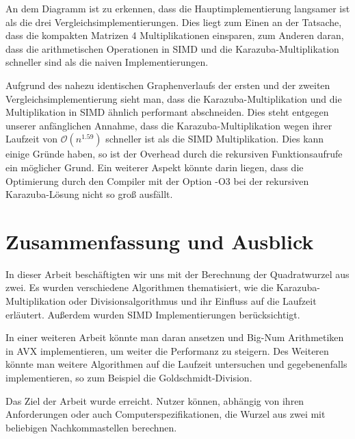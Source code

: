 \documentclass[course=erap]{aspdoc}
\begin{document}
An dem Diagramm ist zu erkennen, dass die Hauptimplementierung langsamer ist als die drei Vergleichsimplementierungen. Dies liegt zum Einen an der Tatsache, dass die kompakten Matrizen 4 Multiplikationen einsparen, zum 
Anderen daran, dass die arithmetischen Operationen in SIMD und die Karazuba-Multiplikation schneller sind als die naiven Implementierungen. \par
Aufgrund des nahezu identischen Graphenverlaufs der ersten und der zweiten Vergleichsimplementierung sieht man, dass die Karazuba-Multiplikation und die Multiplikation in SIMD ähnlich performant abschneiden. Dies steht 
entgegen unserer anfänglichen Annahme, dass die Karazuba-Multiplikation wegen ihrer Laufzeit von $\mathcal{O}(n^{1.59})$ schneller ist als die SIMD Multiplikation. Dies kann einige Gründe haben, so ist der Overhead durch die rekursiven 
Funktionsaufrufe ein möglicher Grund. Ein weiterer Aspekt könnte darin liegen, dass die Optimierung durch den Compiler mit der Option -O3 bei der rekursiven Karazuba-Lösung nicht so groß ausfällt.

\section{Zusammenfassung und Ausblick} \label{sec:zusammenfassung}
In dieser Arbeit beschäftigten wir uns mit der Berechnung der Quadratwurzel aus zwei. Es wurden verschiedene Algorithmen thematisiert, wie die Karazuba-Multiplikation oder Divisionsalgorithmus und ihr Einfluss auf die Laufzeit erläutert. Außerdem wurden SIMD Implementierungen berücksichtigt. \par
In einer weiteren Arbeit könnte man daran ansetzen und Big-Num Arithmetiken in AVX implementieren, um weiter die Performanz zu steigern. Des Weiteren könnte man weitere Algorithmen auf die Laufzeit untersuchen und gegebenenfalls implementieren, so zum Beispiel die Goldschmidt-Division. \par
Das Ziel der Arbeit wurde erreicht. Nutzer können, abhängig von ihren Anforderungen oder auch Computerspezifikationen, die Wurzel aus zwei mit beliebigen Nachkommastellen berechnen.


{}
\end{document}
